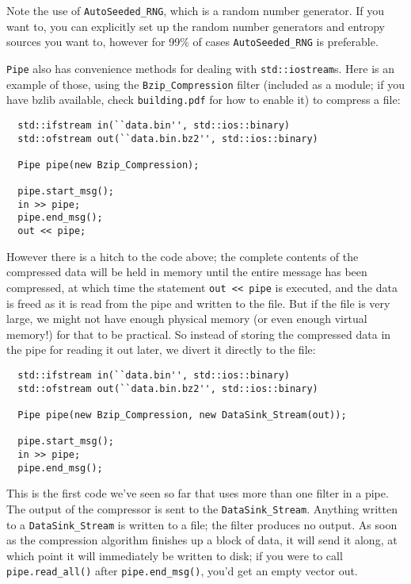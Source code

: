 \documentclass{article}
\newcommand{\filename}[1]{\texttt{#1}}
\newcommand{\type}[1]{\texttt{#1}}
\begin{document}
Note the use of \type{AutoSeeded\_RNG}, which is a random number
generator. If you want to, you can explicitly set up the random number
generators and entropy sources you want to, however for 99\% of cases
\type{AutoSeeded\_RNG} is preferable.

\type{Pipe} also has convenience methods for dealing with
\type{std::iostream}s. Here is an example of those, using the
\type{Bzip\_Compression} filter (included as a module; if you have
bzlib available, check \filename{building.pdf} for how to enable it)
to compress a file:

\begin{verbatim}
  std::ifstream in(``data.bin'', std::ios::binary)
  std::ofstream out(``data.bin.bz2'', std::ios::binary)

  Pipe pipe(new Bzip_Compression);

  pipe.start_msg();
  in >> pipe;
  pipe.end_msg();
  out << pipe;
\end{verbatim}

However there is a hitch to the code above; the complete contents of
the compressed data will be held in memory until the entire message
has been compressed, at which time the statement \verb|out << pipe| is
executed, and the data is freed as it is read from the pipe and
written to the file. But if the file is very large, we might not have
enough physical memory (or even enough virtual memory!) for that to be
practical. So instead of storing the compressed data in the pipe for
reading it out later, we divert it directly to the file:

\begin{verbatim}
  std::ifstream in(``data.bin'', std::ios::binary)
  std::ofstream out(``data.bin.bz2'', std::ios::binary)

  Pipe pipe(new Bzip_Compression, new DataSink_Stream(out));

  pipe.start_msg();
  in >> pipe;
  pipe.end_msg();
\end{verbatim}

This is the first code we've seen so far that uses more than one
filter in a pipe. The output of the compressor is sent to the
\type{DataSink\_Stream}. Anything written to a \type{DataSink\_Stream}
is written to a file; the filter produces no output. As soon as the
compression algorithm finishes up a block of data, it will send it along,
at which point it will immediately be written to disk; if you were to
call \verb|pipe.read_all()| after \verb|pipe.end_msg()|, you'd get an
empty vector out.
\end{document}
